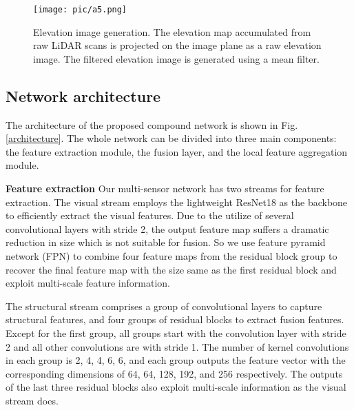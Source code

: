 \documentclass[letterpaper, 10 pt, conference]{ieeeconf}  \usepackage{tabularx}
\begin{document}
\begin{figure}[tp]
	\centering
	\texttt{[image: pic/a5.png]}

	\caption{Elevation image generation. The elevation map accumulated from raw LiDAR scans is projected on the image plane as a raw elevation image. The filtered elevation image is generated using a mean filter.}
	\label{ele_generation}
	\vspace{-10pt}
\end{figure}

\subsection{Network architecture}

The architecture of the proposed compound network is shown in Fig. \ref{architecture}. The whole network can be divided into three main components: the feature extraction module, the fusion layer, and the local feature aggregation module.

\textbf{Feature extraction} Our multi-sensor network has two streams for feature extraction. The visual stream employs the lightweight ResNet18 \cite{he2016deep} as the backbone to efficiently extract the visual features. Due to the utilize of several convolutional layers with stride 2, the output feature map suffers a dramatic reduction in size which is not suitable for fusion. So we use feature pyramid network (FPN) to combine four feature maps from the residual block group to recover the final feature map with the size same as the first residual block and exploit multi-scale feature information. 

The structural stream comprises a group of convolutional layers to capture structural features, and four groups of residual blocks to extract fusion features. Except for the first group, all groups start with the convolution layer with stride 2 and all other convolutions are with stride 1. The number of  kernel convolutions in each group is 2, 4, 4, 6, 6, and each group outputs the feature vector with the corresponding dimensions of 64, 64, 128, 192, and 256 respectively. The outputs of the last three residual blocks also exploit multi-scale information as the visual stream does.
\end{document}
